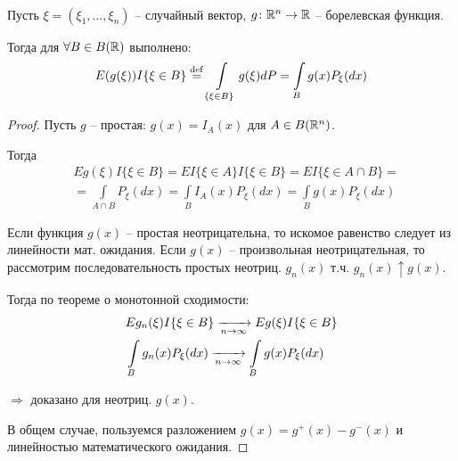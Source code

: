 \begin{theorem}~

  Пусть $\xi = (\xi_1, \ldots, \xi_n)$ -- случайный вектор, 
  $g\colon \mathbb{R}^n \to \mathbb{R}$ -- борелевская функция. 

  Тогда для $\forall B \in B(\mathbb{R})$ выполнено:
  \begin{align*}
    E(g(\xi)) I\{ \xi \in B \} \stackrel{\mathrm{def}}{=} \int\limits_{\{ \xi \in B \}} g(\xi) dP = 
    \int\limits_B g(x) P_{\xi} (dx)
  \end{align*}

  \begin{proof}
    Пусть $g$ -- простая: $g(x) = I_{A}(x)$ для $A \in B(\mathbb{R}^n)$.

    Тогда
    \begin{align*}
      &E g(\xi) I \{ \xi \in B \} = E I \{ \xi \in A \} I \{ \xi \in B \} =
      E I \{ \xi \in A \cap B \} = \\
      &= \int\limits_{A \cap B} P_{\xi} (dx) = \int\limits_{B} I_{A} (x) P_{\xi} (dx) 
      = \int\limits_B g(x) P_{\xi} (dx)
    \end{align*}

    Если функция $g(x)$ -- простая неотрицательна, 
    то искомое равенство следует из линейности мат. ожидания.
    Если $g(x)$ -- произвольная неотрицательная, 
    то рассмотрим последовательность простых неотриц. $g_n(x)$ т.ч. $g_n(x) \uparrow g(x)$.

    Тогда по теореме о монотонной сходимости:
    \begin{align*}
      &E g_n(\xi) I \{ \xi \in B \} \xrightarrow[n \to \infty]{} E g(\xi) I \{ \xi \in B \}\\
      &\int\limits_B g_n (x) P_{\xi} (dx) \xrightarrow[n \to \infty]{} \int\limits_B g(x) P_{\xi} (dx)
    \end{align*}

    $\Rightarrow$ доказано для неотриц. $g(x)$.

    В общем случае, пользуемся разложением $g(x) = g^+(x) - g^-(x)$ и линейностью математического ожидания.
  \end{proof}
\end{theorem}

